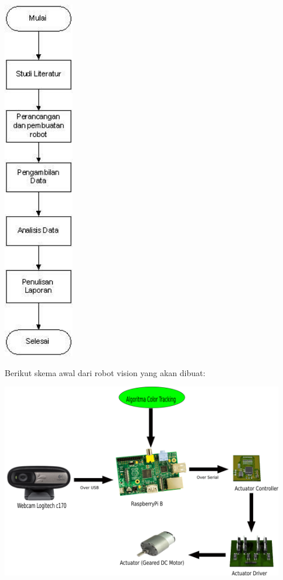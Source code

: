 \documentclass[a4paper,12pt]{article}
\begin{document}
\begin{center}
 \includegraphics[height=450pt]{flow}
\end{center}

\newpage

Berikut skema awal dari robot vision yang akan dibuat:

\begin{center}
 \includegraphics[width=350pt]{desain_awal}
\end{center}
\end{document}
